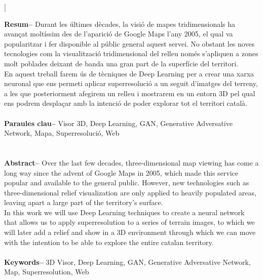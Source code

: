 ﻿\documentclass[10pt,a4paper,twocolumn,twoside]{article}
\begin{document}
\twocolumn[\begin{@twocolumnfalse}


\maketitle

\thispagestyle{primerapagina}
\begin{center}
\parbox{0.915\textwidth}
{\sffamily
\textbf{Resum--}
Durant les últimes dècades, la visió de mapes tridimensionals ha avançat moltíssim des de l'aparició de Google Maps l'any 2005, el qual va popularitzar i fer disponible al públic general aquest servei. No obstant les noves tecnologies com la visualització tridimensional del relleu només s'apliquen a zones molt poblades deixant de banda una gran part de la superfície del territori.\\
En aquest treball farem ús de tècniques de Deep Learning per a crear una xarxa neuronal que ens permeti aplicar superresolució a un seguit d'imatges del terreny, a les que posteriorment afegirem un relleu i mostrarem en un entorn 3D pel qual ens podrem desplaçar amb la intenció de poder explorar tot el territori català.
\\
\\
\textbf{Paraules clau-- }Visor 3D, Deep Learning, GAN, Generative Adversative Network, Mapa, Superresolució, Web\\
\\
\bigskip
\\
\textbf{Abstract--} 
Over the last few decades, three-dimensional map viewing has come a long way since the advent of Google Maps in 2005, which made this service popular and available to the general public. However, new technologies such as three-dimensional relief visualization are only applied to heavily populated areas, leaving apart a large part of the territory's surface. \\
In this work we will use Deep Learning techniques to create a neural network that allows us to apply superresolution to a series of terrain images, to which we will later add a relief and show in a 3D environment through which we can move with the intention to be able to explore the entire catalan territory.
\\
\\
\textbf{Keywords-- } 3D Visor, Deep Learning, GAN, Generative Adversative Network, Map, Superresolution, Web\\
}


\end{center}
\end{@twocolumnfalse}
\end{document}

